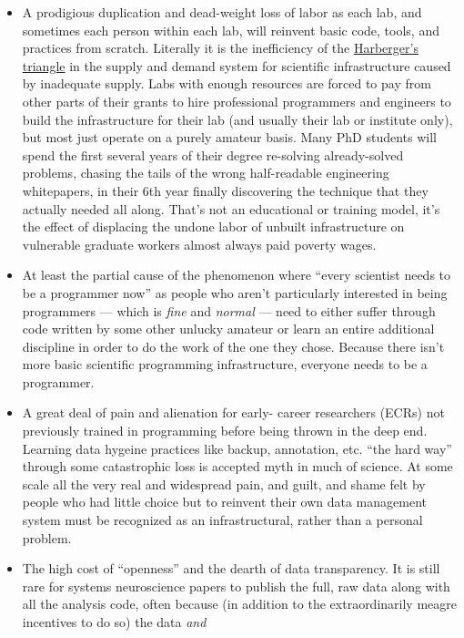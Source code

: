 \documentclass[11pt]{article}
\begin{document}
\begin{multicols}{2}
\begin{itemize}
\item
  A prodigious duplication and dead-weight loss of labor as each lab,
  and sometimes each person within each lab, will reinvent basic code,
  tools, and practices from scratch. Literally it is the inefficiency of
  the
  \href{https://en.wikipedia.org/wiki/Deadweight_loss\#Harberger's_triangle}{Harberger's
  triangle} in the supply and demand system for scientific
  infrastructure caused by inadequate supply. Labs with enough resources
  are forced to pay from other parts of their grants to hire
  professional programmers and engineers to build the infrastructure for
  their lab (and usually their lab or institute only), but most just
  operate on a purely amateur basis. Many PhD students will spend the
  first several years of their degree re-solving already-solved
  problems, chasing the tails of the wrong half-readable engineering
  whitepapers, in their 6th year finally discovering the technique that
  they actually needed all along. That's not an educational or training
  model, it's the effect of displacing the undone labor of unbuilt
  infrastructure on vulnerable graduate workers almost always paid
  poverty wages.
\item
  At least the partial cause of the phenomenon where ``every scientist
  needs to be a programmer now'' as people who aren't particularly
  interested in being programmers --- which is \emph{fine} and
  \emph{normal} --- need to either suffer through code written by some
  other unlucky amateur or learn an entire additional discipline in
  order to do the work of the one they chose. Because there isn't more
  basic scientific programming infrastructure, everyone needs to be a
  programmer.
\item
  A great deal of pain and alienation for early- career researchers
  (ECRs) not previously trained in programming before being thrown in
  the deep end. Learning data hygeine practices like backup, annotation,
  etc. ``the hard way'' through some catastrophic loss is accepted myth
  in much of science. At some scale all the very real and widespread
  pain, and guilt, and shame felt by people who had little choice but to
  reinvent their own data management system must be recognized as an
  infrastructural, rather than a personal problem.
\item
  The high cost of ``openness'' and the dearth of data transparency. It
  is still rare for systems neuroscience papers to publish the full, raw
  data along with all the analysis code, often because (in addition to
  the extraordinarily meagre incentives to do so) the data \emph{and}

\end{itemize}
\end{multicols}
\end{document}
